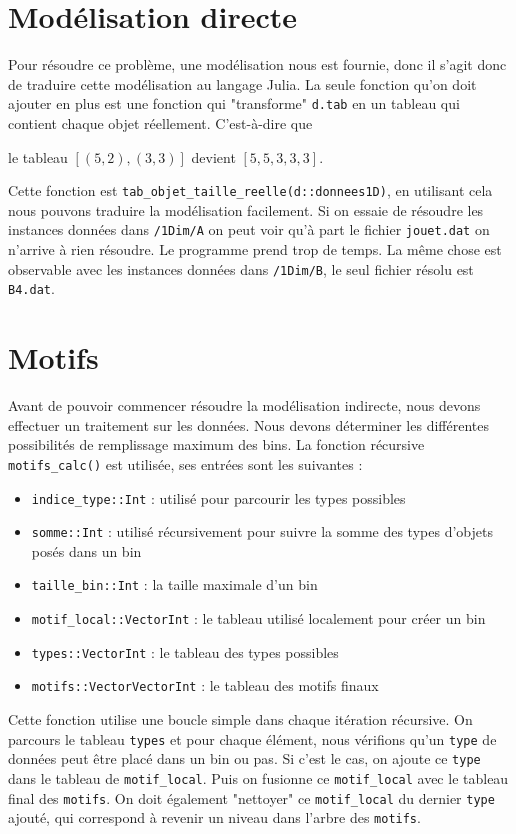 \documentclass{article}
\begin{document}
\section{Modélisation directe}
    Pour résoudre ce problème, une modélisation nous est fournie, donc il s'agit donc de traduire cette modélisation au langage Julia. La seule fonction qu'on doit ajouter en plus est une fonction qui "transforme" \texttt{d.tab} en un tableau qui contient chaque objet réellement. C'est-à-dire que
    \begin{center}
        le tableau $[(5,2), (3,3)]$ devient $[5,5,3,3,3]$.
    \end{center}
    Cette fonction est \texttt{tab\_objet\_taille\_reelle(d::donnees1D)}, en utilisant cela nous pouvons traduire la modélisation facilement. \newline
    Si on essaie de résoudre les instances données dans \texttt{/1Dim/A} on peut voir qu'à part le fichier \texttt{jouet.dat} on n'arrive à rien résoudre. Le programme prend trop de temps. La même chose est observable avec les instances données dans \texttt{/1Dim/B}, le seul fichier résolu est \texttt{B4.dat}.

\section{Motifs}
    Avant de pouvoir commencer résoudre la modélisation indirecte, nous devons effectuer un traitement sur les données. Nous devons déterminer les différentes possibilités de remplissage maximum des bins. La fonction récursive \texttt{motifs\_calc()} est utilisée, ses entrées sont les suivantes :
    \begin{itemize}
        \item \texttt{indice\_type::Int} : utilisé pour parcourir les types possibles
        \item \texttt{somme::Int} : utilisé récursivement pour suivre la somme des types d'objets posés dans un bin
        \item \texttt{taille\_bin::Int} : la taille maximale d'un bin
        \item \texttt{motif\_local::Vector{Int}} : le tableau utilisé localement pour créer un bin
        \item \texttt{types::Vector{Int}} : le tableau des types possibles
        \item \texttt{motifs::Vector{Vector{Int}}} : le tableau des motifs finaux
    \end{itemize}
    Cette fonction utilise une boucle simple dans chaque itération récursive. On parcours le tableau \texttt{types} et pour chaque élément, nous vérifions qu'un \texttt{type} de données peut être placé dans un bin ou pas. Si c'est le cas, on ajoute ce \texttt{type} dans le tableau de \texttt{motif\_local}. Puis on fusionne ce \texttt{motif\_local} avec le tableau final des \texttt{motifs}. On doit également "nettoyer" ce \texttt{motif\_local} du dernier \texttt{type} ajouté, qui correspond à revenir un niveau dans l'arbre des \texttt{motifs}.
    
\end{document}
